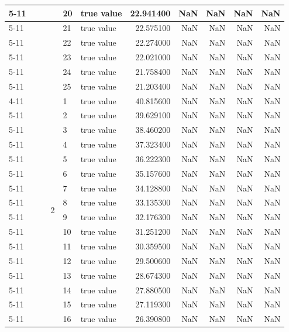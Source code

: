 \begin{tabular}{llllllrrrrr}
\cline{5-11}
 &  &  &  & 20 & true value & 22.941400 & NaN & NaN & NaN & NaN \\
\cline{5-11}
 &  &  &  & 21 & true value & 22.575100 & NaN & NaN & NaN & NaN \\
\cline{5-11}
 &  &  &  & 22 & true value & 22.274000 & NaN & NaN & NaN & NaN \\
\cline{5-11}
 &  &  &  & 23 & true value & 22.021000 & NaN & NaN & NaN & NaN \\
\cline{5-11}
 &  &  &  & 24 & true value & 21.758400 & NaN & NaN & NaN & NaN \\
\cline{5-11}
 &  &  &  & 25 & true value & 21.203400 & NaN & NaN & NaN & NaN \\
\cline{4-11} \cline{5-11}
 &  &  & \multirow[t]{25}{*}{2} & 1 & true value & 40.815600 & NaN & NaN & NaN & NaN \\
\cline{5-11}
 &  &  &  & 2 & true value & 39.629100 & NaN & NaN & NaN & NaN \\
\cline{5-11}
 &  &  &  & 3 & true value & 38.460200 & NaN & NaN & NaN & NaN \\
\cline{5-11}
 &  &  &  & 4 & true value & 37.323400 & NaN & NaN & NaN & NaN \\
\cline{5-11}
 &  &  &  & 5 & true value & 36.222300 & NaN & NaN & NaN & NaN \\
\cline{5-11}
 &  &  &  & 6 & true value & 35.157600 & NaN & NaN & NaN & NaN \\
\cline{5-11}
 &  &  &  & 7 & true value & 34.128800 & NaN & NaN & NaN & NaN \\
\cline{5-11}
 &  &  &  & 8 & true value & 33.135300 & NaN & NaN & NaN & NaN \\
\cline{5-11}
 &  &  &  & 9 & true value & 32.176300 & NaN & NaN & NaN & NaN \\
\cline{5-11}
 &  &  &  & 10 & true value & 31.251200 & NaN & NaN & NaN & NaN \\
\cline{5-11}
 &  &  &  & 11 & true value & 30.359500 & NaN & NaN & NaN & NaN \\
\cline{5-11}
 &  &  &  & 12 & true value & 29.500600 & NaN & NaN & NaN & NaN \\
\cline{5-11}
 &  &  &  & 13 & true value & 28.674300 & NaN & NaN & NaN & NaN \\
\cline{5-11}
 &  &  &  & 14 & true value & 27.880500 & NaN & NaN & NaN & NaN \\
\cline{5-11}
 &  &  &  & 15 & true value & 27.119300 & NaN & NaN & NaN & NaN \\
\cline{5-11}
 &  &  &  & 16 & true value & 26.390800 & NaN & NaN & NaN & NaN \\

\end{tabular}
